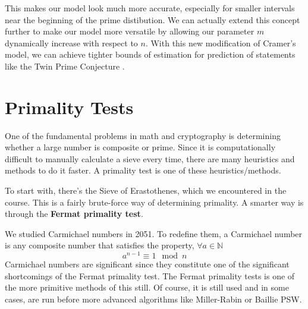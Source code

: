 \documentclass[conference]{IEEEtran}
\begin{document}
This makes our model look much more accurate, especially for smaller intervals near the beginning of the prime distibution. We can actually extend this concept further to make our model more versatile by allowing our parameter $m$ dynamically increase with respect to $n$. With this new modification of Cramer's model, we can achieve tighter bounds of estimation for prediction of statements like the Twin Prime Conjecture \cite{b1}. 

\section{Primality Tests}
One of the fundamental problems in math and cryptography is determining whether a large number is composite or prime. Since it is computationally difficult to manually calculate a sieve every time, there are many heuristics and methods to do it faster. A primality test is one of these heuristics/methods.

To start with, there's the Sieve of Erastothenes, which we encountered in the course. This is a fairly brute-force way of determining primality. A smarter way is through the \textbf{Fermat primality test}.

We studied Carmichael numbers in 2051. To redefine them, a Carmichael number is any composite number that satisfies the property, $\forall a \in \mathbb{N}$
\[
    a^{n -1} \equiv 1 \mod n 
\]
Carmichael numbers are significant since they constitute one of the significant shortcomings of the Fermat primality test. The Fermat primality tests is one of the more primitive methods of this still. Of course, it is still used and in some cases, are run before more advanced algorithms like Miller-Rabin or Baillie PSW.
\end{document}
